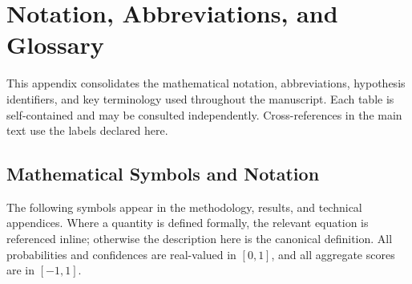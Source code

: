 \documentclass[
  english,
]{article}
\begin{document}
\FloatBarrier

\newpage

\section{Notation, Abbreviations, and
Glossary}\label{notation-abbreviations-and-glossary}

This appendix consolidates the mathematical notation, abbreviations,
hypothesis identifiers, and key terminology used throughout the
manuscript. Each table is self-contained and may be consulted
independently. Cross-references in the main text use the labels declared
here.

\subsection{Mathematical Symbols and
Notation}\label{mathematical-symbols-and-notation}

The following symbols appear in the methodology, results, and technical
appendices. Where a quantity is defined formally, the relevant equation
is referenced inline; otherwise the description here is the canonical
definition. All probabilities and confidences are real-valued in
\([0, 1]\), and all aggregate scores are in \([-1, 1]\).
\end{document}
